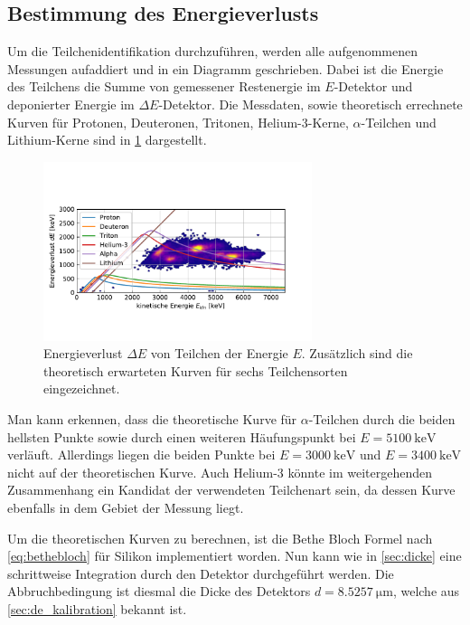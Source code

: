 \subsection{Bestimmung des Energieverlusts}

Um die Teilchenidentifikation durchzuführen, werden alle aufgenommenen Messungen aufaddiert und in ein Diagramm geschrieben.
Dabei ist die Energie des Teilchens die Summe von gemessener Restenergie im $E$-Detektor und deponierter Energie im $\Delta E$-Detektor.
Die Messdaten, sowie theoretisch errechnete Kurven für Protonen, Deuteronen, Tritonen, Helium-3-Kerne, $\alpha$-Teilchen und Lithium-Kerne sind in \cref{fig:energieverlust} dargestellt.

\begin{figure}[ht]
	\centering
	\includegraphics[width=0.7\textwidth]{dat/energieverlust.pdf}
	\caption{Energieverlust $\Delta E$ von Teilchen der Energie $E$. Zusätzlich sind die theoretisch erwarteten Kurven für sechs Teilchensorten eingezeichnet.}
	\label{fig:energieverlust}
\end{figure}

Man kann erkennen, dass die theoretische Kurve für $\alpha$-Teilchen durch die beiden hellsten Punkte sowie durch einen weiteren Häufungspunkt bei $E=\SI{5100}{\kilo\electronvolt}$ verläuft.
Allerdings liegen die beiden Punkte bei $E = \SI{3000}{\kilo\electronvolt}$ und $E=\SI{3400}{\kilo\electronvolt}$ nicht auf der theoretischen Kurve.
Auch Helium-3 könnte im weitergehenden Zusammenhang ein Kandidat der verwendeten Teilchenart sein, da dessen Kurve ebenfalls in dem Gebiet der Messung liegt.

Um die theoretischen Kurven zu berechnen, ist die Bethe Bloch Formel nach \cref{eq:bethebloch} für Silikon implementiert worden.
Nun kann wie in \cref{sec:dicke} eine schrittweise Integration durch den Detektor durchgeführt werden.
Die Abbruchbedingung ist diesmal die Dicke des Detektors $d = \SI{8.5257}{\micro\meter}$, welche aus \cref{sec:de_kalibration} bekannt ist. %

